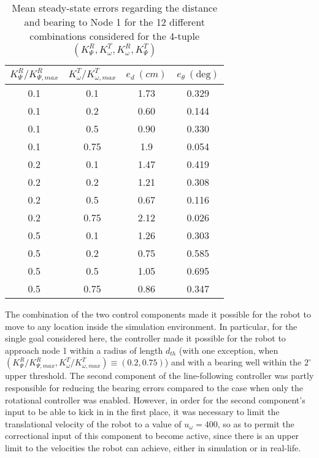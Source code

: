 \begin{table}[H]\centering
    \begin{tabular}{c|c|c|c}
    $K_{\Psi}^R / K_{\Psi,max}^R$ & $K_{\omega}^T / K_{\omega,max}^T$ & $e_{d}\ (cm)$  & $e_{\theta}\ (\text{deg})$ \\ \hline
    0.1        & 0.1          & 1.73    & 0.329     \\
    0.1        & 0.2          & 0.60    & 0.144     \\
    0.1        & 0.5          & 0.90    & 0.330     \\
    0.1        & 0.75         & 1.9     & 0.054     \\
    0.2        & 0.1          & 1.47    & 0.419     \\
    0.2        & 0.2          & 1.21    & 0.308     \\
    0.2        & 0.5          & 0.67    & 0.116     \\
    0.2        & 0.75         & 2.12    & 0.026     \\
    0.5        & 0.1          & 1.26    & 0.303     \\
    0.5        & 0.2          & 0.75    & 0.585     \\
    0.5        & 0.5          & 1.05    & 0.695     \\
    0.5        & 0.75         & 0.86    & 0.347     \\
    \end{tabular}
    \caption{Mean steady-state errors regarding the distance and bearing to Node
      1 for the 12 different combinations considered for the 4-tuple
      $(K_{\Psi}^R, K_{\omega}^T, K_{\omega}^R, K_{\Psi}^T)$}
    \label{tbl:19_errors}
\end{table}


The combination of the two control components made it possible for the robot
to move to any location inside the simulation environment. In particular, for
the single goal considered here, the controller made it possible for the robot
to approach node 1 within a radius of length $d_{th}$ (with one exception, when
$(K_{\Psi}^R / K_{\Psi,max}^R, K_{\omega}^T / K_{\omega,max}^T) \equiv (0.2, 0.75)$)
and with a bearing well within the $2^{\circ}$ upper threshold. The second
component of the line-following controller was partly responsible for reducing
the bearing errors compared to the case when only the rotational controller was
enabled. However, in order for the second component's input to be able to kick
in in the first place, it was necessary to limit the translational velocity of
the robot to a value of $u_{\omega} = 400$, so as to permit the correctional
input of this component to become active, since there is an upper limit to the
velocities the robot can achieve, either in simulation or in real-life.

